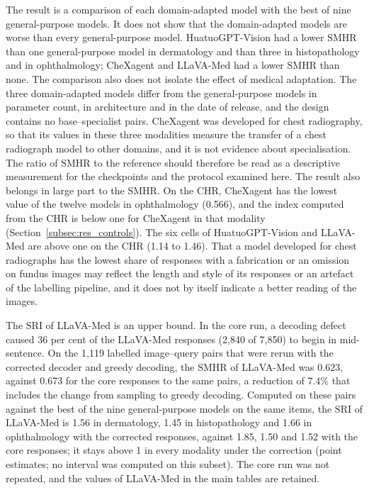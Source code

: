 \documentclass[11pt,a4paper]{article}
\newcommand{\SMHR}{\ensuremath{\mathrm{SMHR}}}
\newcommand{\CHR}{\ensuremath{\mathrm{CHR}}}
\newcommand{\SRI}{\ensuremath{\mathrm{SRI}}}
\begin{document}
The result is a comparison of each domain-adapted model with the best of nine general-purpose models. It does not show that the domain-adapted models are worse than every general-purpose model. HuatuoGPT-Vision had a lower \SMHR{} than one general-purpose model in dermatology and than three in histopathology and in ophthalmology; CheXagent and LLaVA-Med had a lower \SMHR{} than none. The comparison also does not isolate the effect of medical adaptation. The three domain-adapted models differ from the general-purpose models in parameter count, in architecture and in the date of release, and the design contains no base--specialist pairs. CheXagent was developed for chest radiography, so that its values in these three modalities measure the transfer of a chest radiograph model to other domains, and it is not evidence about specialisation. The ratio of \SMHR{} to the reference should therefore be read as a descriptive measurement for the checkpoints and the protocol examined here. The result also belongs in large part to the \SMHR{}. On the \CHR{}, CheXagent has the lowest value of the twelve models in ophthalmology (0.566), and the index computed from the \CHR{} is below one for CheXagent in that modality (Section~\ref{subsec:res_controls}). The six cells of HuatuoGPT-Vision and LLaVA-Med are above one on the \CHR{} (1.14 to 1.46). That a model developed for chest radiographs has the lowest share of responses with a fabrication or an omission on fundus images may reflect the length and style of its responses or an artefact of the labelling pipeline, and it does not by itself indicate a better reading of the images.

The \SRI{} of LLaVA-Med is an upper bound. In the core run, a decoding defect caused 36 per cent of the LLaVA-Med responses (2{,}840 of 7{,}850) to begin in mid-sentence. On the 1{,}119 labelled image--query pairs that were rerun with the corrected decoder and greedy decoding, the \SMHR{} of LLaVA-Med was 0.623, against 0.673 for the core responses to the same pairs, a reduction of 7.4\% that includes the change from sampling to greedy decoding. Computed on these pairs against the best of the nine general-purpose models on the same items, the \SRI{} of LLaVA-Med is 1.56 in dermatology, 1.45 in histopathology and 1.66 in ophthalmology with the corrected responses, against 1.85, 1.50 and 1.52 with the core responses; it stays above 1 in every modality under the correction (point estimates; no interval was computed on this subset). The core run was not repeated, and the values of LLaVA-Med in the main tables are retained.
\end{document}
